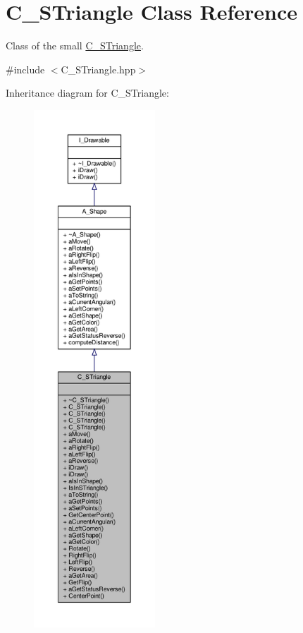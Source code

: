 \hypertarget{classC__STriangle}{}\section{C\+\_\+\+S\+Triangle Class Reference}
\label{classC__STriangle}


Class of the small \hyperlink{classC__STriangle}{C\+\_\+\+S\+Triangle}.  




{\ttfamily \#include $<$C\+\_\+\+S\+Triangle.\+hpp$>$}



Inheritance diagram for C\+\_\+\+S\+Triangle\+:
\nopagebreak
\begin{figure}[H]
\begin{center}
\leavevmode
\includegraphics[height=550pt]{classC__STriangle__inherit__graph}
\end{center}
\end{figure}


